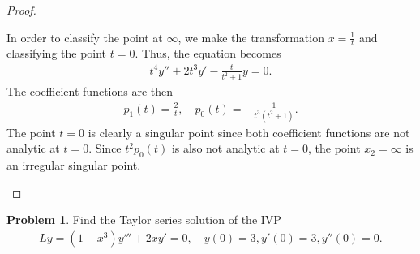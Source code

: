 \documentclass[12pt]{article}
\theoremstyle{definition}
\newtheorem{problem}{Problem}
\begin{document}
\begin{proof}
\begin{enumerate}
      In order to classify the point at $\infty$, we make the transformation $x=\frac{1}{t}$ and classifying the point $t=0$.
      Thus, the equation becomes
      \begin{align*}
        t^4 y'' + 2t^3y' - \frac{t}{t^2+1}y = 0.
      \end{align*}
      The coefficient functions are then
      \begin{align*}
        p_1(t) = \frac{2}{t},\quad p_0(t) = -\frac{1}{t^3(t^2+1)}.
      \end{align*}
      The point $t=0$ is clearly a singular point since both coefficient functions are not analytic at $t=0$.
      Since $t^2p_0(t)$ is also not analytic at $t=0$, the point $x_2 = \infty$ is an irregular singular point.
  \end{enumerate}
\end{proof}
\newpage


\begin{problem}
  Find the Taylor series solution of the IVP
  \begin{align*}
    Ly = (1-x^3)y''' + 2xy' = 0,\quad y(0) = 3, y'(0) = 3, y''(0) = 0.
  \end{align*}
\end{problem}
\end{document}
